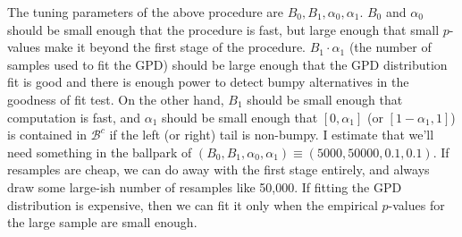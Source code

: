 \documentclass[12pt]{article}
\begin{document}
The tuning parameters of the above procedure are $B_0, B_1, \alpha_0, \alpha_1$. $B_0$ and $\alpha_0$ should be small enough that the procedure is fast, but large enough that small $p$-values make it beyond the first stage of the procedure. $B_1 \cdot \alpha_1$ (the number of samples used to fit the GPD) should be large enough that the GPD distribution fit is good and there is enough power to detect bumpy alternatives in the goodness of fit test. On the other hand, $B_1$ should be small enough that computation is fast, and $\alpha_1$ should be small enough that $[0,\alpha_1]$ (or $[1-\alpha_1, 1]$) is contained in $\mathcal B^c$ if the left (or right) tail is non-bumpy. I estimate that we'll need something in the ballpark of $(B_0, B_1, \alpha_0, \alpha_1) \equiv (5000, 50000, 0.1, 0.1)$. If resamples are cheap, we can do away with the first stage entirely, and always draw some large-ish number of resamples like 50,000. If fitting the GPD distribution is expensive, then we can fit it only when the empirical $p$-values for the large sample are small enough. 
\end{document}
